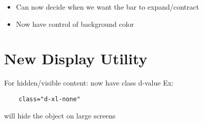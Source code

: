 \documentclass{article}
\begin{document}
	\begin{itemize}
		\item Can now decide when we want the bar to expand/contract
		\item Now have control of background color
	\end{itemize}

\section{New Display Utility}

	For hidden/visible content: now have class d-{value}
	Ex:
	\begin{verbatim}
	class="d-xl-none"
	\end{verbatim}
	will hide the object on large screens
\end{document}
